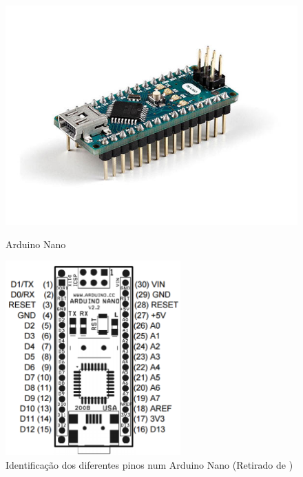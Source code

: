 \begin{figure}[h]
	\centering
	\begin{minipage}[b]{0.49\textwidth}
		\centering
		\includegraphics[width=\textwidth]{img/hardware/nano-img.jpg}
		\caption{Arduino Nano}
		\label{ard2}
	\end{minipage}
	\hfill
	\begin{minipage}[b]{0.49\textwidth}
		\centering
		\includegraphics[width=0.6\textwidth]{img/hardware/nano-esquema.png}
		\caption[Identificação dos diferentes pinos num Arduino Nano]{Identificação dos diferentes pinos num Arduino Nano (Retirado de \cite{arduinonanouser})}
		\label{ard1}
	\end{minipage}
\end{figure}


